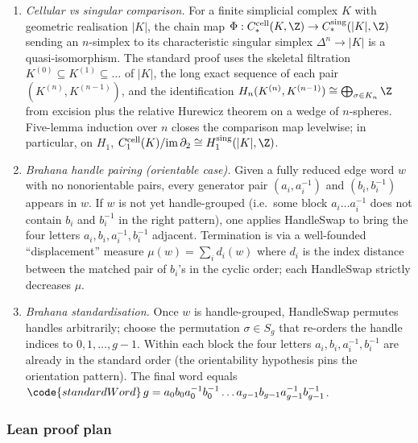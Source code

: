 \begin{enumerate}
\item \emph{Cellular vs singular comparison.}  For a finite simplicial
  complex \(K\) with geometric realisation \(|K|\), the chain map
  \(\Phi:C^{\mathrm{cell}}_{*}(K,\Z)\to C^{\mathrm{sing}}_{*}(|K|,\Z)\)
  sending an \(n\)-simplex to its characteristic singular simplex
  \(\Delta^{n}\to|K|\) is a quasi-isomorphism.  The standard proof uses
  the skeletal filtration \(K^{(0)}\subseteq K^{(1)}\subseteq\dots\)
  of \(|K|\), the long exact sequence of each pair \((K^{(n)},K^{(n-1)})\),
  and the identification \(H_{n}(K^{(n)},K^{(n-1)})\cong\bigoplus_{\sigma\in K_{n}}\Z\)
  from excision plus the relative Hurewicz theorem on a wedge of
  \(n\)-spheres.  Five-lemma induction over \(n\) closes the
  comparison map levelwise; in particular, on \(H_{1}\),
  \(C^{\mathrm{cell}}_{1}(K)/\mathrm{im}\,\partial_{2}\cong H^{\mathrm{sing}}_{1}(|K|,\Z)\).
\item \emph{Brahana handle pairing (orientable case).}  Given a fully
  reduced edge word \(w\) with no nonorientable pairs, every generator
  pair \((a_{i},a_{i}^{-1})\) and \((b_{i},b_{i}^{-1})\) appears in
  \(w\).  If \(w\) is not yet handle-grouped (i.e.\ some block
  \(a_{i}\dots a_{i}^{-1}\) does not contain \(b_{i}\) and \(b_{i}^{-1}\)
  in the right pattern), one applies HandleSwap to bring the four
  letters \(a_{i},b_{i},a_{i}^{-1},b_{i}^{-1}\) adjacent.  Termination
  is via a well-founded ``displacement'' measure
  \(\mu(w)=\sum_{i}d_{i}(w)\) where \(d_{i}\) is the index distance
  between the matched pair of \(b_{i}\)'s in the cyclic order; each
  HandleSwap strictly decreases \(\mu\).
\item \emph{Brahana standardisation.}  Once \(w\) is handle-grouped,
  HandleSwap permutes handles arbitrarily; choose the permutation
  \(\sigma\in S_{g}\) that re-orders the handle indices to
  \(0,1,\dots,g-1\).  Within each block the four letters
  \(a_{i},b_{i},a_{i}^{-1},b_{i}^{-1}\) are already in the standard
  order (the orientability hypothesis pins the orientation pattern).
  The final word equals \(\code{standardWord}\, g
  =a_{0}b_{0}a_{0}^{-1}b_{0}^{-1}\dots a_{g-1}b_{g-1}a_{g-1}^{-1}b_{g-1}^{-1}\).
\end{enumerate}

\subsubsection*{Lean proof plan}


